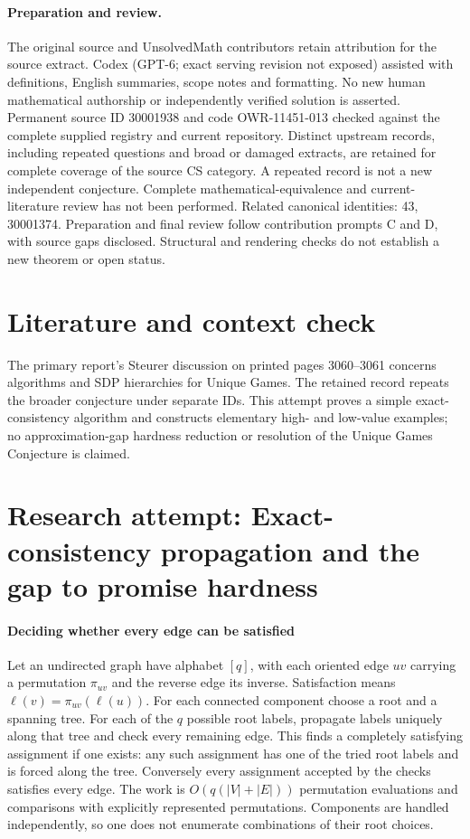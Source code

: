 \documentclass[11pt]{article}
\begin{document}
\paragraph{Preparation and review.}
The original source and UnsolvedMath contributors retain attribution for the source extract. Codex (GPT-6; exact serving revision not exposed) assisted with definitions, English summaries, scope notes and formatting. No new human mathematical authorship or independently verified solution is asserted. Permanent source ID 30001938 and code OWR-11451-013 checked against the complete supplied registry and current repository. Distinct upstream records, including repeated questions and broad or damaged extracts, are retained for complete coverage of the source CS category. A repeated record is not a new independent conjecture. Complete mathematical-equivalence and current-literature review has not been performed. Related canonical identities: 43, 30001374. Preparation and final review follow contribution prompts C and D, with source gaps disclosed. Structural and rendering checks do not establish a new theorem or open status.
\label{end:30001938}

\section{Literature and context check}
The primary report's Steurer discussion on printed pages 3060--3061 concerns algorithms and SDP hierarchies for Unique Games. The retained record repeats the broader conjecture under separate IDs. This attempt proves a simple exact-consistency algorithm and constructs elementary high- and low-value examples; no approximation-gap hardness reduction or resolution of the Unique Games Conjecture is claimed.
\section{Research attempt: Exact-consistency propagation and the gap to promise hardness}

\paragraph{Deciding whether every edge can be satisfied}
Let an undirected graph have alphabet $[q]$, with each oriented edge $uv$ carrying a permutation $\pi_{uv}$ and the reverse edge its inverse. Satisfaction means $\ell(v)=\pi_{uv}(\ell(u))$. For each connected component choose a root and a spanning tree. For each of the $q$ possible root labels, propagate labels uniquely along that tree and check every remaining edge. This finds a completely satisfying assignment if one exists: any such assignment has one of the tried root labels and is forced along the tree. Conversely every assignment accepted by the checks satisfies every edge. The work is $O(q(|V|+|E|))$ permutation evaluations and comparisons with explicitly represented permutations. Components are handled independently, so one does not enumerate combinations of their root choices.
\end{document}
